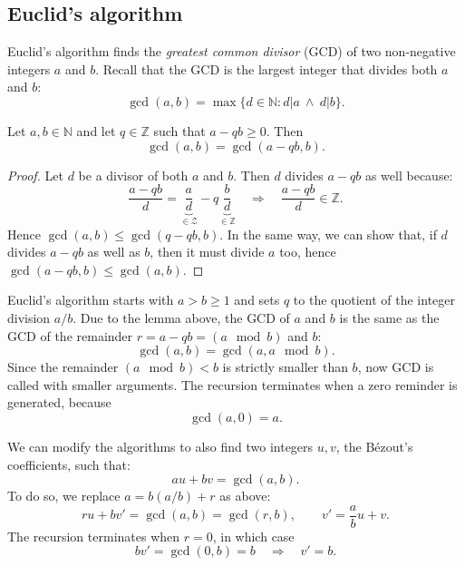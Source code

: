 \subsection{Euclid's algorithm}\label{s:impl-euclid}

Euclid's algorithm finds the \emph{greatest common divisor} (GCD) of two non-negative integers $a$ and $b$. Recall that the GCD is the largest integer that divides both $a$ and $b$:
\[
    \gcd(a,b) = \max\{ d \in \mathbb{N} : d|a \ \wedge\ d|b \}.
\]

\begin{lemma}
Let $a,b\in\mathbb{N}$ and let $q\in\mathbb{Z}$ such that $a - qb \geq 0$. Then
$$
\gcd(a,b) = \gcd(a-qb,b).
$$
\end{lemma}
\begin{proof}
Let $d$ be a divisor of both $a$ and $b$. Then $d$ divides $a - qb$ as well because:
$$
\frac{a - qb}{d} = 
\underbrace{\frac{a}{d}}_{\in\mathcal{Z}} - q 
\underbrace{\frac{b}{d}}_{\in\mathbb{Z}}
\quad\Rightarrow\quad
\frac{a - qb}{d} \in \mathbb{Z}.
$$
Hence  $\gcd(a,b) \leq \gcd(q-qb,b)$. In the same way, we can show that, if $d$ divides $a - qb$ as well as $b$, then it must divide $a$ too, hence $\gcd(a-qb, b) \leq\gcd(a,b)$.
\end{proof}

Euclid's algorithm starts with $a > b \geq 1$ and sets $q$ to the quotient of the integer division $a/b$. Due to the lemma above, the GCD of $a$ and $b$ is the same as the GCD of the remainder $r = a - qb = (a \mod b)$ and $b$:
\[
   \gcd(a,b) = \gcd(a, a\mod b).
\]
Since the remainder $(a\mod b) < b$ is strictly smaller than $b$, now GCD is called with smaller arguments. The recursion terminates when a zero reminder is generated, because
\[
   \gcd(a,0) = a.
\]

We can modify the algorithms to also find two integers  $u,v$, the B\'ezout's coefficients, such that:
$$
   a u + bv = \gcd(a,b).
$$
To do so, we replace $a = b (a/b) + r$ as above:
$$
  ru  +  b v'= \gcd(a,b) = \gcd(r,b), \qquad v' = \frac{a}{b} u + v.
$$
The recursion terminates when $r=0$, in which case
$$
  b v'= \gcd(0,b) = b \quad\Rightarrow\quad v'=b.
$$





